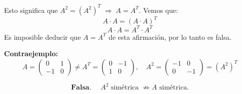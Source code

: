 \documentclass[a4paper,12pt]{article}
\begin{document}
\begin{ejercicio}[title=Ejercicio 42 (⋆)]
\vspace{0.5em}

Esto significa que $A^2 = (A^2)^T \;\Rightarrow\; A = A^T$.  
Vemos que:
\[
A \cdot A = (A \cdot A)^T
\]
\[
A \cdot A = A^T \cdot A^T
\]
Es imposible deducir que $A = A^T$ de esta afirmación, por lo tanto es falsa.

\vspace{0.5em}

\textbf{Contraejemplo:}  
\[
A = \begin{pmatrix}0 & 1 \\ -1 & 0\end{pmatrix} \neq A^T = \begin{pmatrix}0 & -1 \\ 1 & 0\end{pmatrix}, \quad
A^2 = \begin{pmatrix}-1 & 0 \\ 0 & -1\end{pmatrix} = (A^2)^T
\]

\[
\boxed{\textbf{Falsa. }\quad  A^2 \text{ simétrica } \not\Rightarrow A \text{ simétrica.}}
\]

\end{ejercicio}
\end{document}

